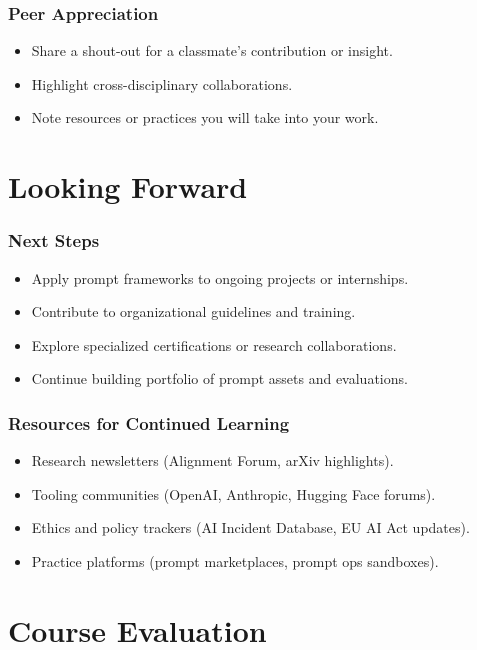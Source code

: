 \documentclass{beamer}
\begin{document}
\begin{frame}
    \frametitle{Peer Appreciation}
    \begin{itemize}
        \item Share a shout-out for a classmate's contribution or insight.
        \item Highlight cross-disciplinary collaborations.
        \item Note resources or practices you will take into your work.
    \end{itemize}
\end{frame}

\section{Looking Forward}

\begin{frame}
    \frametitle{Next Steps}
    \begin{itemize}
        \item Apply prompt frameworks to ongoing projects or internships.
        \item Contribute to organizational guidelines and training.
        \item Explore specialized certifications or research collaborations.
        \item Continue building portfolio of prompt assets and evaluations.
    \end{itemize}
\end{frame}

\begin{frame}
    \frametitle{Resources for Continued Learning}
    \begin{itemize}
        \item Research newsletters (Alignment Forum, arXiv highlights).
        \item Tooling communities (OpenAI, Anthropic, Hugging Face forums).
        \item Ethics and policy trackers (AI Incident Database, EU AI Act updates).
        \item Practice platforms (prompt marketplaces, prompt ops sandboxes).
    \end{itemize}
\end{frame}

\section{Course Evaluation}
\end{document}
